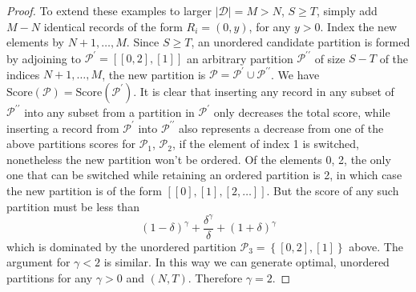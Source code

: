 \documentclass{article}
\theoremstyle{case}
\begin{document}
\begin{proof}
To extend these examples to larger $\vert \mathcal{D} \vert = M > N$, $S \geq T$, simply add $M-N$ identical records of the form $R_i = \left( 0, y\right)$, for any $y > 0$. Index the new elements by $N+1, \dots, M$. Since $S \geq T$, an unordered candidate partition is formed by adjoining to $\mathcal{P}^{\prime} = \left[\left[0, 2\right], \left[ 1\right]\right]$ an arbitrary partition $\mathcal{P}^{\prime\prime}$ of size $S - T$ of the indices $N+1, \dots, M$, the new partition is $\mathcal{P} = \mathcal{P}^{\prime} \cup \mathcal{P}^{\prime\prime}$. We have $\text{Score}\left(\mathcal{P}\right) = \text{Score}\left(\mathcal{P}^{\prime}\right)$. It is clear that inserting any record in any subset of $\mathcal{P}^{\prime\prime}$ into any subset from a partition in $\mathcal{P}^{\prime}$ only decreases the total score, while inserting a record from $\mathcal{P}^{\prime}$ into $\mathcal{P}^{\prime\prime}$ also represents a decrease from one of the above partitions scores for $\mathcal{P}_1$, $\mathcal{P}_2$, if the element of index 1 is switched, nonetheless the new partition won't be ordered. Of the elements 0, 2, the only one that can be switched while retaining an ordered partition is 2, in which case the new partition is of the form $\left[ \left[ 0\right], \left[ 1\right], \left[ 2, \dots\right]\right]$. But the score of any such partition must be less than
\[
\left( 1-\delta\right)^\gamma + \frac{\delta^\gamma}{\delta} + \left( 1+\delta\right)^\gamma
\]
which is dominated by the unordered partition $\mathcal{P}_3 = \left\lbrace \left[ 0, 2 \right], \left[ 1 \right]\right\rbrace$ above. The argument for $\gamma < 2$ is similar. In this way we can generate optimal, unordered partitions for any $\gamma > 0$ and $\left( N, T\right)$. Therefore $\gamma = 2$.
\end{proof}
\end{document}
